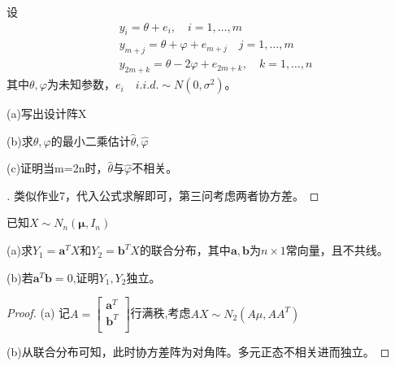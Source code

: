 \documentclass[cn,hazy,green,12pt,normal]{elegantnote}
\numberwithin{equation}{section}
\numberwithin{subsection}{section}
\begin{document}
\begin{homework}
    设\[
    \begin{aligned}
        &y_i=\theta +e_i, \quad i=1,\dots,m\\
        &y_{m+j}=\theta +\varphi +e_{m+j}\quad j=1,\dots,m\\
        &y_{2m+k}=\theta -2\varphi +e_{2m+k},\quad k=1,\dots,n
    \end{aligned}
    \]
    其中$\theta,\varphi$为未知参数，$e_i\quad i.i.d. \sim N(0,\sigma^2)$。

    (a)写出设计阵X

    (b)求$\theta,\varphi$的最小二乘估计$\hat{\theta},\hat{\varphi}$

    (c)证明当m=2n时，$\hat{\theta}$与$\hat{\varphi}$不相关。
\end{homework}
\begin{proof}[\solutionname]
    类似作业7，代入公式求解即可，第三问考虑两者协方差。
\end{proof}

\begin{homework}
    已知$X\sim N_n(\bm \mu, I_n )$

    (a)求$Y_1=\bm a ^T X$和$Y_2=\bm b^T X$的联合分布，其中$\bm a, \bm b$为$n\times 1$常向量，且不共线。

    (b)若$\bm a^T \bm b=0$,证明$Y_1,Y_2$独立。
\end{homework}

\begin{proof}
    (a) 记$A=\begin{bmatrix}
        \bm a^T\\
        \bm b^T\\
    \end{bmatrix}$行满秩,考虑$AX\sim N_2(A\mu,AA^T)$
    
    (b)从联合分布可知，此时协方差阵为对角阵。多元正态不相关进而独立。
\end{proof}
\end{document}
